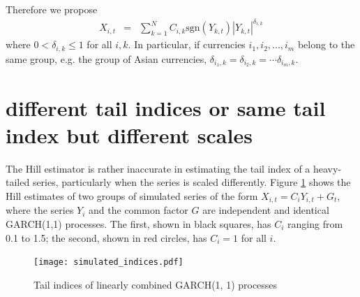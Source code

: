 \documentclass{article}
\begin{document}
Therefore we propose
\begin{eqnarray*}
  X_{i,t} &=& \sum_{k=1}^N C_{i,k} \text{sgn}(Y_{k,t}) |Y_{k,t}|^{\delta_{i,k}}
\end{eqnarray*}
where $0 < \delta_{i,k} \leq 1$ for all $i, k$. In particular, if
currencies $i_1, i_2, ..., i_m$ belong to the same group, e.g. the
group of Asian currencies, $\delta_{i_1, k} = \delta_{i_2, k} = \cdots
\delta_{i_m, k}$.

\section{different tail indices or same tail index but different scales}
The Hill estimator is rather inaccurate in estimating the tail index
of a heavy-tailed series, particularly when the series is scaled
differently. Figure \ref{fig:simulated.indices} shows the Hill
estimates of two groups of simulated series of the form
$X_{i,t} = C_i Y_{i, t} + G_t$, where the series 
$Y_{i}$ and the common factor $G$ are independent and identical
GARCH(1,1) processes. The first, shown in black squares, has $C_i$
ranging from 0.1 to 1.5; the second, shown in red circles, has
$C_i = 1$ for all $i$.
\begin{figure}[htb!]
  \texttt{[image: simulated\_indices.pdf]}
  \caption{Tail indices of linearly combined GARCH(1, 1) processes}
  \label{fig:simulated.indices}
\end{figure}








\end{document}
